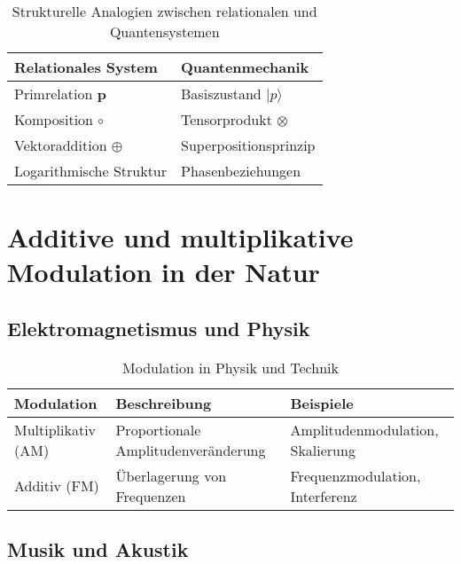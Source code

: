 \documentclass[11pt,a4paper]{article}
\newcommand{\primrel}[1]{\mathbf{#1}}
\begin{document}
	\begin{table}[htbp]
		\centering
		\begin{adjustbox}{width=0.85\textwidth}
			\begin{tabular}{ll}
				\toprule
				\textbf{Relationales System} & \textbf{Quantenmechanik} \\
				\midrule
				Primrelation $\primrel{p}$ & Basiszustand $|p\rangle$ \\
				Komposition $\circ$ & Tensorprodukt $\otimes$ \\
				Vektoraddition $\oplus$ & Superpositionsprinzip \\
				Logarithmische Struktur & Phasenbeziehungen \\
				\bottomrule
			\end{tabular}
		\end{adjustbox}
		\caption{Strukturelle Analogien zwischen relationalen und Quantensystemen}
		\label{tab:quantenanalogien}
	\end{table}
	
	\section{Additive und multiplikative Modulation in der Natur}
	
	\subsection{Elektromagnetismus und Physik}
	
	\begin{table}[htbp]
		\centering
		\begin{adjustbox}{width=0.9\textwidth}
			\begin{tabular}{lll}
				\toprule
				\textbf{Modulation} & \textbf{Beschreibung} & \textbf{Beispiele} \\
				\midrule
				Multiplikativ (AM) & Proportionale Amplitudenveränderung & Amplitudenmodulation, Skalierung \\
				Additiv (FM) & Überlagerung von Frequenzen & Frequenzmodulation, Interferenz \\
				\bottomrule
			\end{tabular}
		\end{adjustbox}
		\caption{Modulation in Physik und Technik}
		\label{tab:modulation}
	\end{table}
	
	\subsection{Musik und Akustik}
	
\end{document}
